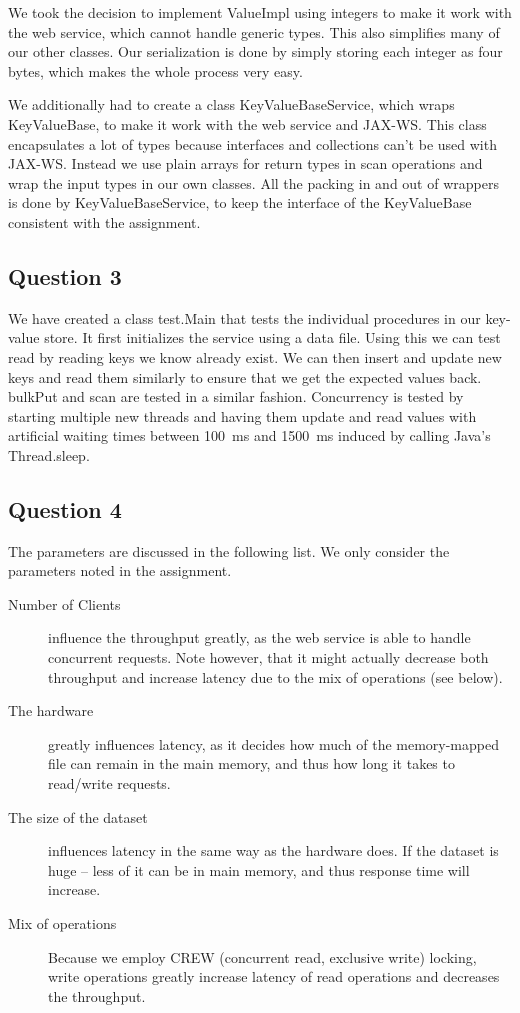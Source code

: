 \documentclass[a4paper,final]{article}
\newcommand{\mono}[1]{{\ttfamily#1}}
\begin{document}
We took the decision to implement \mono{ValueImpl} using integers to make it
work with the web service, which cannot handle generic types. This also
simplifies many of our other classes. Our serialization is done by simply
storing each integer as four bytes, which makes the whole process very easy.

We additionally had to create a class \mono{KeyValueBaseService}, which wraps
\mono{KeyValueBase}, to make it work with the web service and JAX-WS. This
class encapsulates a lot of types because interfaces and collections can't be
used with JAX-WS. Instead we use plain arrays for return types in scan
operations and wrap the input types in our own classes. All the packing in
and out of wrappers is done by \mono{KeyValueBaseService}, to keep the
interface of the \mono{KeyValueBase} consistent with the assignment.

\subsection*{Question 3}

We have created a class \mono{test.Main} that tests the individual procedures
in our key-value store. It first initializes the service using a data file.
Using this we can test \mono{read} by reading keys we know already exist. We
can then \mono{insert} and \mono{update} new keys and read them similarly to
ensure that we get the expected values back. \mono{bulkPut} and \mono{scan} are
tested in a similar fashion. Concurrency is tested by starting multiple new
threads and having them \mono{update} and \mono{read} values with artificial
waiting times between 100~ms and 1500~ms induced by calling Java's
\mono{Thread.sleep}.

\subsection*{Question 4}
The parameters are discussed in the following list. We only consider the
parameters noted in the assignment.

\begin{description}
    \item [Number of Clients] influence the throughput greatly, as the web
        service is able to handle concurrent requests. Note however, that it
        might actually decrease both throughput and increase latency due to
        the mix of operations (see below).
    \item [The hardware] greatly influences latency, as it decides how much of
        the memory-mapped file can remain in the main memory, and thus how
        long it takes to read/write requests.
    \item [The size of the dataset] influences latency in the same way as the
        hardware does. If the dataset is huge -- less of it can be in main
        memory, and thus response time will increase.
    \item [Mix of operations] Because we employ CREW (concurrent read,
        exclusive write) locking, write operations greatly increase latency
        of read operations and decreases the throughput.
\end{description}
\end{document}
